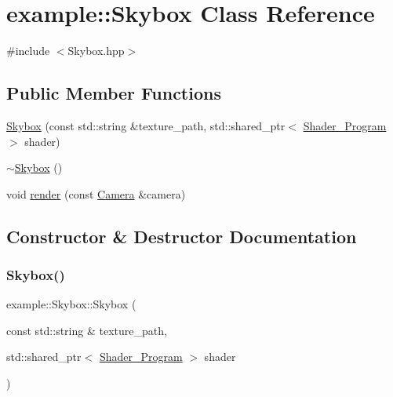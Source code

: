 \hypertarget{classexample_1_1_skybox}{}\section{example\+:\+:Skybox Class Reference}
\label{classexample_1_1_skybox}


{\ttfamily \#include $<$Skybox.\+hpp$>$}

\subsection*{Public Member Functions}
\begin{DoxyCompactItemize}
\item 
\mbox{\hyperlink{classexample_1_1_skybox_ae3d4d4dbb08f9bfcfb4dd80abe47bd7a}{Skybox}} (const std\+::string \&texture\+\_\+path, std\+::shared\+\_\+ptr$<$ \mbox{\hyperlink{classexample_1_1_shader___program}{Shader\+\_\+\+Program}} $>$ shader)
\item 
\mbox{\hyperlink{classexample_1_1_skybox_abeed66eef405ebc5d29a4bdd949210d8}{$\sim$\+Skybox}} ()
\item 
void \mbox{\hyperlink{classexample_1_1_skybox_a0f6edb0a0b5b81cb31c55b9207a82ad6}{render}} (const \mbox{\hyperlink{classexample_1_1_camera}{Camera}} \&camera)
\end{DoxyCompactItemize}


\subsection{Constructor \& Destructor Documentation}
\mbox{\label{classexample_1_1_skybox_ae3d4d4dbb08f9bfcfb4dd80abe47bd7a}} 
\subsubsection{\texorpdfstring{Skybox()}{Skybox()}}
{\footnotesize\ttfamily example\+::\+Skybox\+::\+Skybox (\begin{DoxyParamCaption}\item[{const std\+::string \&}]{texture\+\_\+path,  }\item[{std\+::shared\+\_\+ptr$<$ \mbox{\hyperlink{classexample_1_1_shader___program}{Shader\+\_\+\+Program}} $>$}]{shader }\end{DoxyParamCaption})}

